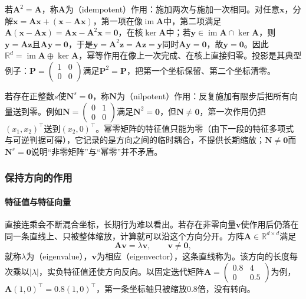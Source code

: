 若$\bm A^2=\bm A$，称$\bm A$为（idempotent）作用：施加两次与施加一次相同。对任意$\bm x$，分解$\bm x=\bm A\bm x+(\bm x-\bm A\bm x)$，第一项在像$\operatorname{im}\bm A$中，第二项满足$\bm A(\bm x-\bm A\bm x)=\bm A\bm x-\bm A^2\bm x=\bm0$，在核$\ker\bm A$中；若$\bm y\in\operatorname{im}\bm A\cap\ker\bm A$，则$\bm y=\bm A\bm z$且$\bm A\bm y=\bm0$，于是$\bm y=\bm A^2\bm z=\bm A\bm z=\bm y$同时$\bm A\bm y=\bm0$，故$\bm y=\bm0$。因此$\mathbb R^d=\operatorname{im}\bm A\oplus\ker\bm A$，幂等作用在像上一次完成、在核上直接归零。投影是其典型例子：$\bm P=\begin{pmatrix}1&0\\0&0\end{pmatrix}$满足$\bm P^2=\bm P$，把第一个坐标保留、第二个坐标清零。

若存在正整数$s$使$\bm N^s=\bm0$，称$\bm N$为（nilpotent）作用：反复施加有限步后把所有向量送到零。例如$\bm N=\begin{pmatrix}0&1\\0&0\end{pmatrix}$满足$\bm N^2=\bm0$，但$\bm N\neq\bm0$，第一次作用仍把$(x_1,x_2)^\top$送到$(x_2,0)^\top$。幂零矩阵的特征值只能为零（由下一段的特征多项式与可逆判据可得），它记录的是方向之间的临时耦合，不提供长期缩放；$\bm N\neq\bm0$而$\bm N^s=\bm0$说明“非零矩阵”与“幂零”并不矛盾。

\subsubsection{保持方向的作用}
\label{sec:matrix-analysis-spectrum}

\paragraph{特征值与特征向量}

直接连乘会不断混合坐标，长期行为难以看出。若存在非零向量$\bm v$使作用后仍落在同一条直线上、只被整体缩放，计算就可以沿这个方向分开。方阵$\bm A\in\mathbb R^{d\times d}$满足
\begin{equation}
 \bm A\bm v=\lambda\bm v,\qquad \bm v\neq\bm0,
 \label{eq:matrix-analysis-eigenpair}
\end{equation}
就称$\lambda$为（eigenvalue），$\bm v$为相应（eigenvector），这条直线称为。该方向的长度每次乘以$|\lambda|$，实负特征值还使方向反向。以固定迭代矩阵$\bm A=\begin{pmatrix}0.8&4\\0&0.5\end{pmatrix}$为例，$\bm A(1,0)^\top=0.8(1,0)^\top$，第一条坐标轴只被缩放$0.8$倍，没有转向。

